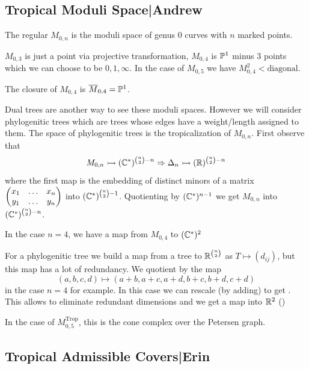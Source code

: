\documentclass[12pt]{memoir}
\DeclareMathOperator{\Trop}{Trop}
\begin{document}
\subsection{Tropical Moduli Space|Andrew}

The regular $M_{0,n}$ is the moduli space of genus $0$ curves with $n$ marked points. 

\begin{Ex}
    $M_{0,3}$ is just a point via projective transformation, $M_{0,4}$ is $\mathbb{P}^1$ minus $3$ points which we can choose to be $0,1,\infty$. In the case of $M_{0,5}$ we have $M_{0,4}^2\less\text{diagonal}$.\par 
    The closure of $M_{0,4}$ is $\overline{M}_{0,4}=\mathbb{P}^1$.
\end{Ex}

Dual trees are another way to see these moduli spaces. However we will consider phylogenitic trees which are trees whose edges have a weight/length assigned to them. The space of phylogenitic trees is the tropicalization of $M_{0,n}$. First observe that 
$$M_{0,n}\rightarrowtail (\mathbb{C}^\ast)^{\binom{n}{2}-n}\Rightarrow \Delta_n\rightarrowtail(\mathbb{R})^{\binom{n}{2}-n}$$
where the first map is the embedding of distinct minors of a matrix $\begin{pmatrix} x_1 & \dots & x_n\\ y_1 & \dots & y_n \end{pmatrix}$ into $(\mathbb{C}^\ast)^{\binom{n}{2}-1}$. Quotienting by $(\mathbb{C}^\ast)^{n-1}$ we get $M_{0,n}$ into $(\mathbb{C}^\ast)^{\binom{n}{2}-n}$.

\begin{Ex}
    In the case $n=4$, we have a map from $M_{0,4}$ to $(\mathbb{C}^\ast)^2$ 
\end{Ex}

For a phylogenitic tree we build a map from a tree to $\mathbb{R}^{\binom{n}{2}}$ as $T\mapsto (d_{ij})$, but this map has a lot of redundancy. We quotient by the map 
$$(a,b,c,d)\mapsto(a+b,a+c,a+d,b+c,b+d,c+d)$$
in the case $n=4$ for example. In this case we can rescale (by adding) to get . This allows to eliminate redundant dimensions and we get a map into $\mathbb{R}^2$ ()\par 
In the case of $M_{0,5}^{\Trop}$, this is the cone complex over the Petersen graph. 

\subsection{Tropical Admissible Covers|Erin}
\end{document}
